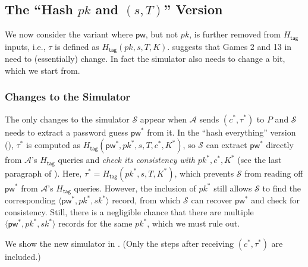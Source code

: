 \documentclass{article}
\theoremstyle{plain}
\theoremstyle{definition}
\theoremstyle{remark}
\newcommand{\adv}{\mathcal{A}}
\renewcommand{\sim}{\mathcal{S}}
\newcommand{\Htag}{H_\mathsf{tag}}
\newcommand{\pw}{\mathsf{pw}}
\begin{document}
\subsection{The ``Hash $pk$ and $(s,T)$'' Version}
\label{sec:hash-pk-st}
We now consider the variant where $\pw$, but not $pk$, is further removed from $\Htag$ inputs, i.e., $\tau$ is defined as $\Htag(pk,s,T,K)$.  suggests that Games 2 and 13 in  need to (essentially) change. In fact the simulator also needs to change a bit, which we start from.

\subsubsection{Changes to the Simulator}
The only changes to the simulator $\sim$ appear when $\adv$ sends $(c^*,\tau^*)$ to $P$ and $\sim$ needs to extract a password guess $\pw^*$ from it. In the ``hash everything'' version (), $\tau^*$ is computed as $\Htag(\pw^*,pk^*,s,T,c^*,K^*)$, so $\sim$ can extract $\pw^*$ directly from $\adv$'s $\Htag$ queries and \emph{check its consistency with $pk^*,c^*,K^*$} (see the last paragraph of ). Here, $\tau^* = \Htag(pk^*,s,T,K^*)$, which prevents $\sim$ from reading off $\pw^*$ from $\adv$'s $\Htag$ queries. However, the inclusion of $pk^*$ still allows $\sim$ to find the corresponding $\langle\pw^*,pk^*,sk^*\rangle$ record, from which $\sim$ can recover $\pw^*$ and check for consistency. Still, there is a negligible chance that there are multiple $\langle\pw^*,pk^*,sk^*\rangle$ records for the same $pk^*$, which we must rule out.

We show the new simulator in . (Only the steps after receiving $(c^*,\tau^*)$ are included.)
\end{document}
